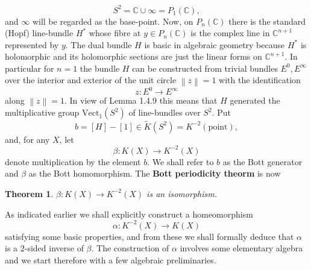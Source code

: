 \documentclass[leqno]{book}
\numberwithin{equation}{section}
\newtheorem{theorem}{Theorem}[section]%
\theoremstyle{definition}
\renewcommand{\emph}{\textbf}
\begin{document}
            \begin{equation*}
              S^{2}=\mathbb{C}\cup \infty=P_{1}(\mathbb{C}),
            \end{equation*}
            and $\infty$ will be regarded as the base-point. Now, on $P_{n}(\mathbb{C})$ there is the standard (Hopf) line-bundle $H^{*}$ whose fibre at $y\in P_{n}(\mathbb{C})$ is the complex line in $\mathbb{C}^{n+1}$ represented by $y$. The dual bundle $H$ is basic in algebraic geometry because $H^{*}$ is holomorphic and its holomorphic sections are just the linear forms on $\mathbb{C}^{n+1}$. In particular for $n=1$ the bundle $H$ can be constructed from trivial bundles $E^{0},E^{\infty}$ over the interior and exterior of the unit circle $\left\| z \right\|=1$ with the identification
            \begin{equation*}
              z:E^{0}\to E^{\infty}
            \end{equation*}
            along $\left\| z \right\|=1$. In view of Lemma 1.4.9 this means that $H$ generated the multiplicative group $\operatorname{Vect_1}(S^{2})$ of line-bundles over $S^{2}$. Put
            \begin{equation*}
              b=[H]-[1]\in \tilde{K}(S^{2})=K^{-2}(\text{point}),
            \end{equation*}
            and, for any $X$, let
            \begin{equation*}
              \beta:K(X)\to K^{-2}(X)
            \end{equation*}
            denote multiplication by the element $b$. We shall refer to $b$ as the Bott generator and $\beta$ as the Bott homomorphism. The \emph{Bott periodicity theorm} is now

            \begin{theorem}
              $\beta:K(X)\to K^{-2}(X)$ is an isomorphism.
            \end{theorem}

            As indicated earlier we shall explicitly construct a homeomorphism
            \begin{equation*}
              \alpha:K^{-2}(X)\to K(X)
            \end{equation*}
            satisfying some basic properties, and from these we shall formally deduce that $\alpha$ is a $2$-sided inverse of $\beta$. The construction of $\alpha$ involves some elementary algebra and we start therefore with a few algebraic preliminaries.
\end{document}

